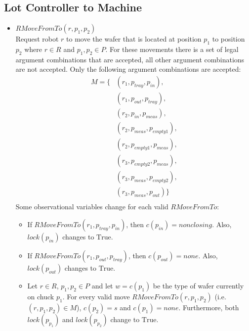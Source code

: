 \subsection{Lot Controller to Machine}
\begin{itemize}
    \item $\mathit{RMoveFromTo}(r, p_1, p_2)$ \\
        Request robot $r$ to move the wafer that is located at position $p_1$ to position $p_2$ where $r \in R$ and $p_1, p_2 \in P$.
        For these movements there is a set of legal argument combinations that are accepted, all other argument combinations are not accepted.
        Only the following argument combinations are accepted:
        \begin{align*}
            M = \{ & \left(r_1, p_\mathit{tray},   p_\mathit{in}     \right), \\
                   & \left(r_1, p_\mathit{out},    p_\mathit{tray}   \right), \\
                   & \left(r_2, p_\mathit{in},     p_\mathit{meas}   \right), \\
                   & \left(r_2, p_\mathit{meas},   p_\mathit{empty1} \right), \\
                   & \left(r_2, p_\mathit{empty1}, p_\mathit{meas}   \right), \\
                   & \left(r_3, p_\mathit{empty2}, p_\mathit{meas}   \right), \\
                   & \left(r_3, p_\mathit{meas},   p_\mathit{empty2} \right), \\
                   & \left(r_3, p_\mathit{meas},   p_\mathit{out}    \right)\} \\
        \end{align*}
        Some observational variables change for each valid $\mathit{RMoveFromTo}$:
        \begin{itemize}
            \item If $\mathit{RMoveFromTo}\left(r_1, p_\mathit{tray}, p_\mathit{in}\right)$, then $c\left(p_\mathit{in}\right) = \mathit{nonclosing}$.
                Also, $\mathit{lock}(p_\mathit{in})$ changes to $\text{True}$.
            \item If $\mathit{RMoveFromTo}\left(r_1, p_\mathit{out}, p_\mathit{tray}\right)$, then $c\left(p_\mathit{out}\right) = \mathit{none}$.
                Also, $\mathit{lock}(p_\mathit{out})$ changes to $\text{True}$.
            \item Let $r \in R$, $p_1, p_2 \in P$ and let $w = c\left(p_1\right)$ be the type of wafer currently on chuck $p_1$.
                For every valid move $\mathit{RMoveFromTo}\left(r, p_1, p_2\right)$ (i.e. $\left(r, p_1, p_2\right) \in M$), $c\left(p_2\right) = s$ and $c\left(p_1\right) = none$.
                Furthermore, both  $\mathit{lock}(p_\mathit{p_1})$ and  $\mathit{lock}(p_\mathit{p_2})$ change to $\text{True}$.
        \end{itemize}


\end{itemize}
